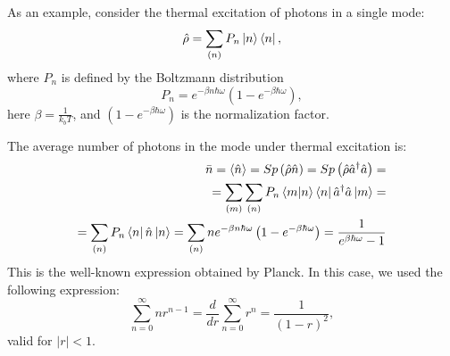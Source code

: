As an example, consider the thermal excitation of photons in a single
mode:
\begin{equation}
\hat{\rho} = \sum_{(n)}
P_n\ket{n}\bra{n},
\label{eqCh1_teplovvozb}
\end{equation}
where $P_n$ is defined by the Boltzmann distribution
\[
P_n = e^{-\beta n \hbar \omega}\left(1  -  e^{-\beta \hbar \omega}\right),
\]
here  $\beta = \frac{1}{k_b T}$, and $\left(1  -  e^{-\beta \hbar
  \omega}\right)$ is the normalization factor. 

The average number of photons in the mode under thermal excitation is:
\begin{eqnarray}
\bar{n} = \left<\hat{n}\right> =  Sp \left(\hat{\rho}\hat{n}\right) = 
Sp \left(\hat{\rho}\hat{a}^{\dag}\hat{a}\right) = 
\nonumber \\
=\sum_{(m)}\sum_{(n)}
P_n\bra{m}\ket{n}\bra{n}\hat{a}^{\dag}\hat{a}\ket{m}
= 
\nonumber \\
= \sum_{(n)}
P_n\bra{n}\hat{n}\ket{n} = \sum_{(n)} n
e^{-\beta n \hbar \omega}\left(1  -  e^{-\beta \hbar \omega}\right) = 
\frac{1}{e^{\beta \hbar \omega} - 1}
\label{eqCh1_plank}
\end{eqnarray}
This is the well-known expression obtained by Planck. In this case, we
used the following expression:
\[
\sum_{n=0}^{\infty} n r^{n -1} = \frac{d}{d r} \sum_{n=0}^{\infty}
r^{n} = \frac{1}{\left(1 - r\right)^2},
\]
valid for $\left|r\right| < 1$.

